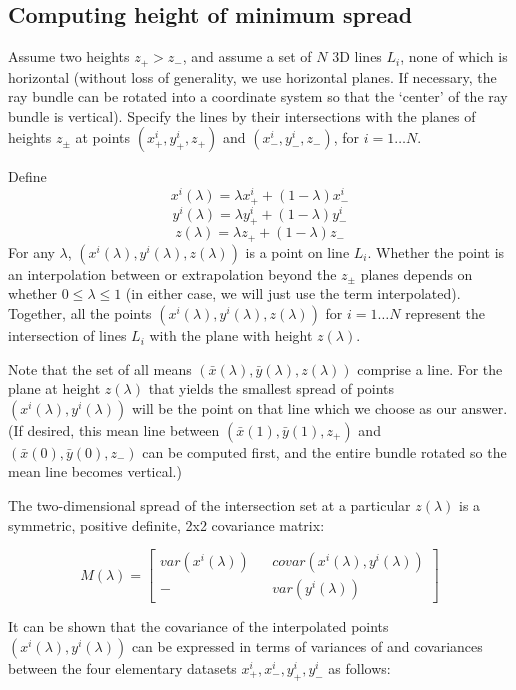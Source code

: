 \documentclass[10pt]{amsart}
\begin{document}
\subsection{Computing height of minimum spread}
Assume two heights $z_{+} > z_{-}$, and assume a set of $N$ 3D lines $L_i$, none
of which is horizontal (without loss of generality, we use horizontal planes. If
necessary, the ray bundle can be rotated into a coordinate system so that the
`center' of the ray bundle is vertical). Specify the lines by their
intersections with the planes of heights $z_\pm$ at points
$(x_{+}^{i},y_{+}^{i}, z_+)$ and $(x_{-}^{i},y_{-}^{i}, z_-)$, for $i=1\ldots
N$.

Define
$$x^i(\lambda) = \lambda x^i_+ + (1-\lambda) x^i_-$$
$$y^i(\lambda) = \lambda y^i_+ + (1-\lambda) y^i_-$$
$$z(\lambda) = \lambda z_+ + (1-\lambda) z_-$$ For any $\lambda$,
$(x^i(\lambda), y^i(\lambda), z(\lambda))$ is a point on line $L_i$. Whether the
point is an interpolation between or extrapolation beyond the $z_\pm$ planes
depends on whether $0\le\lambda\le 1$ (in either case, we will just use the term
interpolated). Together, all the points $(x^i(\lambda), y^i(\lambda),
z(\lambda))$ for $i=1\ldots N$ represent the intersection of lines $L_i$ with
the plane with height $z(\lambda)$.

Note that the set of all means $(\bar{x}(\lambda),\bar{y}(\lambda),z(\lambda))$
comprise a line. For the plane at height $z(\lambda)$ that yields the smallest
spread of points $(x^i(\lambda),y^i(\lambda))$ will be the point on that line
which we choose as our answer. (If desired, this mean line between $(\bar{x}(1),
\bar{y}(1),z_+)$ and $(\bar{x}(0),\bar{y}(0),z_-)$ can be computed first, and
the entire bundle rotated so the mean line becomes vertical.)

The two-dimensional spread of the intersection set at a particular $z(\lambda)$
is a symmetric, positive definite, 2x2 covariance matrix:

\[M(\lambda) =
\begin{bmatrix}
 var(x^i(\lambda)) && covar(x^i(\lambda),y^i(\lambda)) \\
  -                && var(y^i(\lambda))
\end{bmatrix}
\]

It can be shown that the covariance of the interpolated points
$(x^i(\lambda), y^i(\lambda))$ can be expressed in terms of variances of and
covariances between the four elementary datasets $x^i_+, x^i_-, y^i_+, y^i_-$ as
follows:
\end{document}
